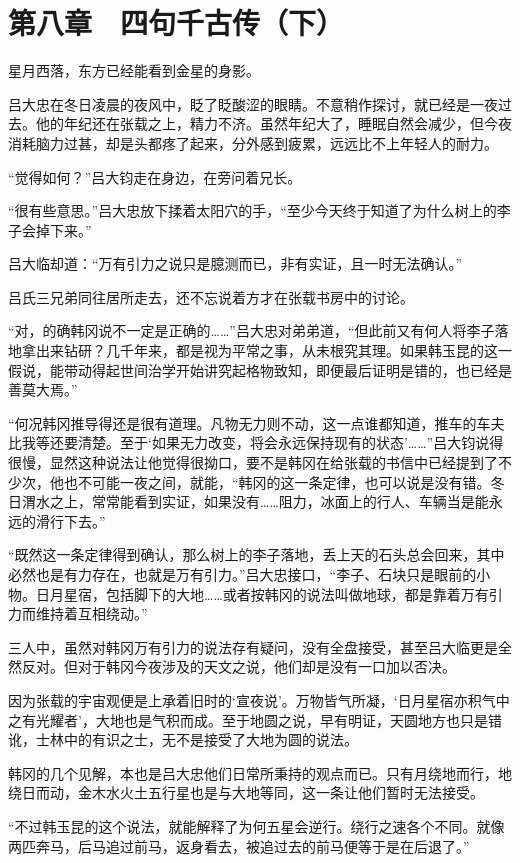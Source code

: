 \section{第八章　四句千古传（下）}

星月西落，东方已经能看到金星的身影。

吕大忠在冬日凌晨的夜风中，眨了眨酸涩的眼睛。不意稍作探讨，就已经是一夜过去。他的年纪还在张载之上，精力不济。虽然年纪大了，睡眠自然会减少，但今夜消耗脑力过甚，却是头都疼了起来，分外感到疲累，远远比不上年轻人的耐力。

“觉得如何？”吕大钧走在身边，在旁问着兄长。

“很有些意思。”吕大忠放下揉着太阳穴的手，“至少今天终于知道了为什么树上的李子会掉下来。”

吕大临却道：“万有引力之说只是臆测而已，非有实证，且一时无法确认。”

吕氏三兄弟同往居所走去，还不忘说着方才在张载书房中的讨论。

“对，的确韩冈说不一定是正确的……”吕大忠对弟弟道，“但此前又有何人将李子落地拿出来钻研？几千年来，都是视为平常之事，从未根究其理。如果韩玉昆的这一假说，能带动得起世间治学开始讲究起格物致知，即便最后证明是错的，也已经是善莫大焉。”

“何况韩冈推导得还是很有道理。凡物无力则不动，这一点谁都知道，推车的车夫比我等还要清楚。至于‘如果无力改变，将会永远保持现有的状态’……”吕大钧说得很慢，显然这种说法让他觉得很拗口，要不是韩冈在给张载的书信中已经提到了不少次，他也不可能一夜之间，就能，“韩冈的这一条定律，也可以说是没有错。冬日渭水之上，常常能看到实证，如果没有……阻力，冰面上的行人、车辆当是能永远的滑行下去。”

“既然这一条定律得到确认，那么树上的李子落地，丢上天的石头总会回来，其中必然也是有力存在，也就是万有引力。”吕大忠接口，“李子、石块只是眼前的小物。日月星宿，包括脚下的大地……或者按韩冈的说法叫做地球，都是靠着万有引力而维持着互相绕动。”

三人中，虽然对韩冈万有引力的说法存有疑问，没有全盘接受，甚至吕大临更是全然反对。但对于韩冈今夜涉及的天文之说，他们却是没有一口加以否决。

因为张载的宇宙观便是上承着旧时的‘宣夜说’。万物皆气所凝，‘日月星宿亦积气中之有光耀者’，大地也是气积而成。至于地圆之说，早有明证，天圆地方也只是错讹，士林中的有识之士，无不是接受了大地为圆的说法。

韩冈的几个见解，本也是吕大忠他们日常所秉持的观点而已。只有月绕地而行，地绕日而动，金木水火土五行星也是与大地等同，这一条让他们暂时无法接受。

“不过韩玉昆的这个说法，就能解释了为何五星会逆行。绕行之速各个不同。就像两匹奔马，后马追过前马，返身看去，被追过去的前马便等于是在后退了。”

